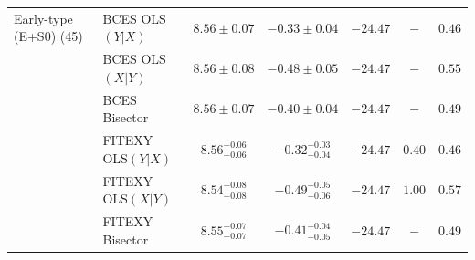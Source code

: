 \documentclass[preprint2]{emulateapj}
\begin{document}
\begin{table}
\begin{tabular}{llccccc}
%
%
Early-type (E+S0) (45) & BCES OLS$(Y|X)$   & $8.56 \pm 0.07$ & $-0.33 \pm 0.04$ & $-24.47$ & $-$    & $0.46$ \\
 		       & BCES OLS$(X|Y)$   & $8.56 \pm 0.08$ & $-0.48 \pm 0.05$ & $-24.47$ & $-$    & $0.55$ \\
 		       & BCES Bisector     & $8.56 \pm 0.07$ & $-0.40 \pm 0.04$ & $-24.47$ & $-$    & $0.49$ \\
 		       & FITEXY OLS$(Y|X)$ & $8.56^{+0.06}_{-0.06}$ & $-0.32^{+0.03}_{-0.04}$ & $-24.47$ & $0.40$ & $0.46$ \\
 		       & FITEXY OLS$(X|Y)$ & $8.54^{+0.08}_{-0.08}$ & $-0.49^{+0.05}_{-0.06}$ & $-24.47$ & $1.00$ & $0.57$\\
 		       & FITEXY Bisector   & $8.55^{+0.07}_{-0.07}$ & $-0.41^{+0.04}_{-0.05}$ & $-24.47$ & $-$    & $0.49$ \\


\end{tabular}
\end{table}
\end{document}
